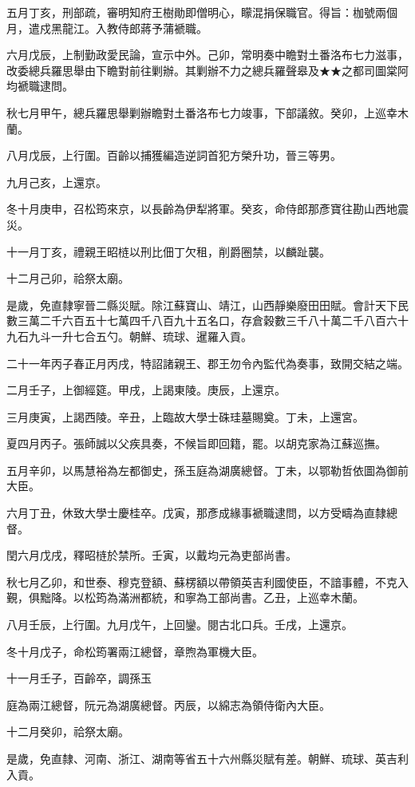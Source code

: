 \begin{pinyinscope}
五月丁亥，刑部疏，審明知府王樹勛即僧明心，矇混捐保職官。得旨：枷號兩個月，遣戍黑龍江。入教侍郎蔣予蒲褫職。

六月戊辰，上制勤政愛民論，宣示中外。己卯，常明奏中瞻對土番洛布七力滋事，改委總兵羅思舉由下瞻對前往剿辦。其剿辦不力之總兵羅聲皋及★★之都司圖棠阿均褫職逮問。

秋七月甲午，總兵羅思舉剿辦瞻對土番洛布七力竣事，下部議敘。癸卯，上巡幸木蘭。

八月戊辰，上行圍。百齡以捕獲編造逆詞首犯方榮升功，晉三等男。

九月己亥，上還京。

冬十月庚申，召松筠來京，以長齡為伊犁將軍。癸亥，命侍郎那彥寶往勘山西地震災。

十一月丁亥，禮親王昭梿以刑比佃丁欠租，削爵圈禁，以麟趾襲。

十二月己卯，祫祭太廟。

是歲，免直隸寧晉二縣災賦。除江蘇寶山、靖江，山西靜樂廢田田賦。會計天下民數三萬二千六百五十七萬四千八百九十五名口，存倉穀數三千八十萬二千八百六十九石九斗一升七合五勺。朝鮮、琉球、暹羅入貢。

二十一年丙子春正月丙戌，特詔諸親王、郡王勿令內監代為奏事，致開交結之端。

二月壬子，上御經筵。甲戌，上謁東陵。庚辰，上還京。

三月庚寅，上謁西陵。辛丑，上臨故大學士硃珪墓賜奠。丁未，上還宮。

夏四月丙子。張師誠以父疾具奏，不候旨即回籍，罷。以胡克家為江蘇巡撫。

五月辛卯，以馬慧裕為左都御史，孫玉庭為湖廣總督。丁未，以鄂勒哲依圖為御前大臣。

六月丁丑，休致大學士慶桂卒。戊寅，那彥成緣事褫職逮問，以方受疇為直隸總督。

閏六月戊戌，釋昭梿於禁所。壬寅，以戴均元為吏部尚書。

秋七月乙卯，和世泰、穆克登額、蘇楞額以帶領英吉利國使臣，不諳事體，不克入覲，俱黜降。以松筠為滿洲都統，和寧為工部尚書。乙丑，上巡幸木蘭。

八月壬辰，上行圍。九月戊午，上回鑾。閱古北口兵。壬戌，上還京。

冬十月戊子，命松筠署兩江總督，章煦為軍機大臣。

十一月壬子，百齡卒，調孫玉

庭為兩江總督，阮元為湖廣總督。丙辰，以綿志為領侍衛內大臣。

十二月癸卯，祫祭太廟。

是歲，免直隸、河南、浙江、湖南等省五十六州縣災賦有差。朝鮮、琉球、英吉利入貢。


\end{pinyinscope}
